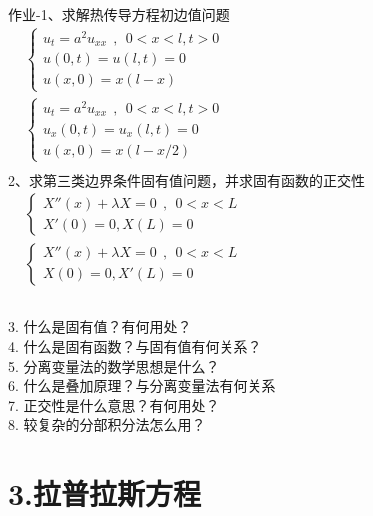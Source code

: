 \begin{frame}
	\frametitle{}
	作业-1、求解热传导方程初边值问题\\
	$\begin{array}{lllllllll}
		&\begin{cases}
			u_{t} =a^2u_{xx} ~~,~~ 0<x<l, t>0\\
			u(0,t) =u(l,t)=0 \\
			u(x,0) =x (l-x)
		\end{cases}\\	
		&\begin{cases}
			u_{t} =a^2u_{xx} ~~,~~ 0<x<l, t>0\\
			u_x(0,t) =u_x(l,t)=0 \\
			u(x,0) =x(l-x/2)
		\end{cases} \\	
	\end{array}$ \\ 
	2、求第三类边界条件固有值问题，并求固有函数的正交性\\
	$\begin{array}{lllllllll}
		& \begin{cases}
			X'' (x)  + \lambda X =0   ~~,~~ 0<x<L\\
			X' (0) =0, X (L) =0
		\end{cases}\\	
		&\begin{cases}
			X'' (x)  + \lambda X =0   ~~,~~ 0<x<L\\
			X (0) =0, X' (L) =0
		\end{cases} \\	
	\end{array}$ 	
\end{frame}	

\begin{frame}
	\frametitle{}
	3. 什么是固有值？有何用处？
	\\
	4. 什么是固有函数？与固有值有何关系？ 
	\\
	5. 分离变量法的数学思想是什么？
	\\
	6. 什么是叠加原理？与分离变量法有何关系
	\\
	7. 正交性是什么意思？有何用处？
	\\
	8. 较复杂的分部积分法怎么用？	
\end{frame}	


\section{3.拉普拉斯方程}
